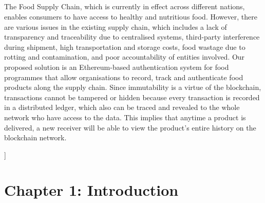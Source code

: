 \documentclass[12pt,a4paper,twocolumn,fleqn]{article}
\makeatletter
\renewenvironment{abstract}{%
    \if@twocolumn
      \section*{\abstractname}%
    \else %
      \begin{center}%
        {\bfseries \Large\abstractname\vspace{\z@}}%
      \end{center}%
      \quotation
    \fi}
    {\if@twocolumn\else\endquotation\fi}
\makeatother
\begin{document}
\begin{@twocolumnfalse}
\begin{abstract}

The Food Supply Chain, which is currently in effect across different nations, enables consumers to have access to healthy and nutritious food. However, there are various issues in the existing supply chain, which includes a lack of transparency and traceability due to centralised systems, third-party interference during shipment, high transportation and storage costs, food wastage due to rotting and contamination, and poor accountability of entities involved. Our proposed solution is an Ethereum-based authentication system for food programmes that allow organisations to record, track and authenticate food products along the supply chain. Since immutability is a virtue of the blockchain, transactions cannot be tampered or hidden because every transaction is recorded in a distributed ledger, which also can be traced and revealed to the whole network who have access to the data. This implies that anytime a product is delivered, a new receiver will be able to view the product's entire history on the blockchain network.
\end{abstract}
\end{@twocolumnfalse}]
\linenumbers
\nolinenumbers
\onecolumn
\newpage
  \pagestyle{fancy}
  \fancyhf{}
  \renewcommand{\headrulewidth}{0pt}
\tableofcontents
\newpage
  \pagestyle{fancy}
  \fancyhf{}
  \renewcommand{\headrulewidth}{0pt}
\listoffigures
\newpage
  \pagestyle{fancy}
  \thispagestyle{empty}
  \thispagestyle{plain}
  \fancyhf{}
  \chead{}
  \renewcommand{\headrulewidth}{0.4pt}%
\renewcommand{\footrulewidth}{0.4pt}%
\normalsize
\section{Chapter 1: Introduction}
\end{document}
